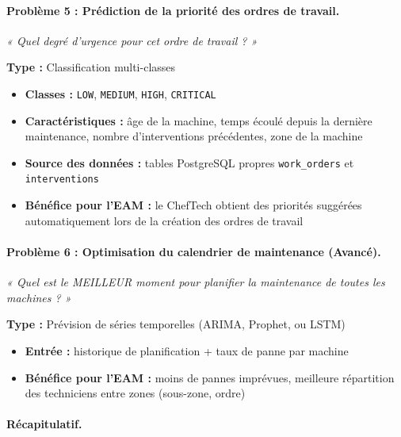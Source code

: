 \paragraph{Problème 5 : Prédiction de la priorité des ordres de travail.}
\emph{« Quel degré d'urgence pour cet ordre de travail ? »}

\textbf{Type :} Classification multi-classes

\begin{itemize}
\item \textbf{Classes :} \texttt{LOW}, \texttt{MEDIUM}, \texttt{HIGH}, \texttt{CRITICAL}
\item \textbf{Caractéristiques :} âge de la machine, temps écoulé depuis la dernière maintenance, nombre d'interventions précédentes, zone de la machine
\item \textbf{Source des données :} tables PostgreSQL propres \texttt{work\_orders} et \texttt{interventions}
\item \textbf{Bénéfice pour l'EAM :} le ChefTech obtient des priorités suggérées automatiquement lors de la création des ordres de travail
\end{itemize}

\paragraph{Problème 6 : Optimisation du calendrier de maintenance (Avancé).}
\emph{« Quel est le MEILLEUR moment pour planifier la maintenance de toutes les machines ? »}

\textbf{Type :} Prévision de séries temporelles (ARIMA, Prophet, ou LSTM)

\begin{itemize}
\item \textbf{Entrée :} historique de planification + taux de panne par machine
\item \textbf{Bénéfice pour l'EAM :} moins de pannes imprévues, meilleure répartition des techniciens entre zones (sous-zone, ordre)
\end{itemize}

\paragraph{Récapitulatif.}

